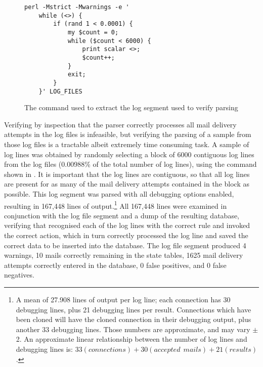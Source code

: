 \renewcommand{\figurename}{Figure}

\begin{figure}[thbp]
    \caption{The command used to extract the log segment used to verify
         parsing}
    \empty{}\label{Command to extract log segment used to verify parsing}

\begin{verbatim}
perl -Mstrict -Mwarnings -e '
    while (<>) {
        if (rand 1 < 0.0001) {
            my $count = 0;
            while ($count < 6000) {
                print scalar <>;
                $count++;
            }
            exit;
        }
    }' LOG_FILES
\end{verbatim}

\end{figure}

Verifying by inspection that the parser correctly processes all
\numberOFconnectionsINlogFILES{} mail delivery attempts in the
\numberOFlogFILES{} log files is infeasible, but verifying the parsing of a
sample from those log files is a tractable albeit extremely time consuming
task.  A sample of log lines was obtained by randomly selecting a block of
6000 contiguous log lines from the \numberOFlogFILES{} log files (0.00988\%
of the total number of log lines), using the command shown in
.  It is
important that the log lines are contiguous, so that all log lines are
present for as many of the mail delivery attempts contained in the block as
possible.  This log segment was parsed with all debugging options enabled,
resulting in 167,448 lines of output.\footnote{A mean of 27.908 lines of
output per log line; each connection has 30 debugging lines, plus 21
debugging lines per result.  Connections which have been cloned will have
the cloned connection in their debugging output, plus another 33 debugging
lines.  Those numbers are approximate, and may vary $\pm{}$ 2.  An
approximate linear relationship between the number of log lines and
debugging lines is: $33(connections) + 30(accepted~~mails) + 21(results)$.}
All 167,448 lines were examined in conjunction with the log file segment
and a dump of the resulting database, verifying that \parsername{}
recognised each of the log lines with the correct rule and invoked the
correct action, which in turn correctly processed the log line and saved
the correct data to be inserted into the database.  The log file segment
produced 4 warnings, 10 mails correctly remaining in the state tables, 1625
mail delivery attempts correctly entered in the database, 0 false
positives, and 0 false negatives.

